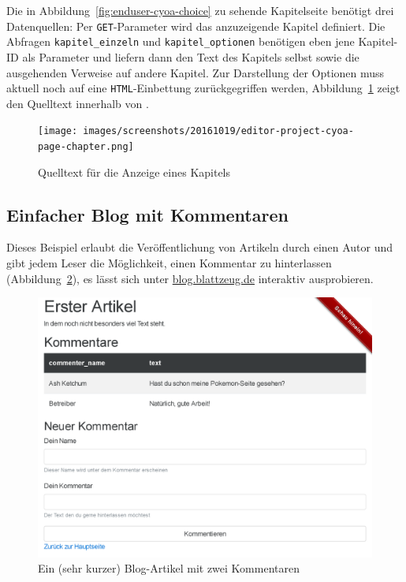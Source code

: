 Die in Abbildung~\ref{fig:enduser-cyoa-choice} zu sehende Kapitelseite benötigt drei Datenquellen: Per \texttt{GET}-Parameter wird das anzuzeigende Kapitel definiert. Die Abfragen \texttt{kapitel\_einzeln} und \texttt{kapitel\_optionen} benötigen eben jene Kapitel-ID als Parameter und liefern dann den Text des Kapitels selbst sowie die ausgehenden Verweise auf andere Kapitel. Zur Darstellung der Optionen muss aktuell noch auf eine \texttt{HTML}-Einbettung zurückgegriffen werden, Abbildung~\ref{fig:project-cyoa-page-chapter} zeigt den Quelltext innerhalb von \idename{}.

\begin{figure}[h]
  \centering \texttt{[image: images/screenshots/20161019/editor-project-cyoa-page-chapter.png]}
  \caption{Quelltext für die Anzeige eines Kapitels}
  \label{fig:project-cyoa-page-chapter}
\end{figure}

\subsection{Einfacher Blog mit Kommentaren}

Dieses Beispiel erlaubt die Veröffentlichung von Artikeln durch einen Autor und gibt jedem Leser die Möglichkeit, einen Kommentar zu hinterlassen (Abbildung~\ref{fig:enduser-blog-article}), es lässt sich unter \href{http://blog.blattzeug.de/}{blog.blattzeug.de} interaktiv ausprobieren.

\begin{figure}[h]
  \centering \includegraphics[width=\textwidth-2pt,frame]{images/screenshots/20161019/enduser-blog-article.png}
  \caption{Ein (sehr kurzer) Blog-Artikel mit zwei Kommentaren}
  \label{fig:enduser-blog-article}
\end{figure}

